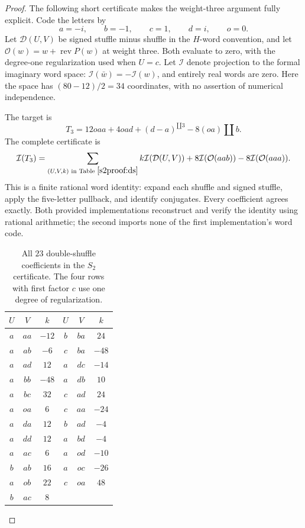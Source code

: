 \documentclass[11pt]{article}
\numberwithin{equation}{section}
\theoremstyle{plain}
\theoremstyle{definition}
\theoremstyle{remark}
\newcommand{\sh}{\mathbin{\amalg}}
\begin{document}
\begin{proof}
The following short certificate makes the weight-three argument fully
explicit.  Code the letters by
\[
 a=-i,\qquad b=-1,\qquad c=1,\qquad d=i,\qquad o=0.
\]
Let $\mathcal D(U,V)$ be signed stuffle minus shuffle in the $H$-word
convention, and let
$\mathcal O(w)=w+\operatorname{rev}P(w)$ at weight three.  Both evaluate
to zero, with the degree-one regularization used when $U=c$.
Let $\mathcal I$ denote projection to the formal imaginary word space:
$\mathcal I(\bar w)=-\mathcal I(w)$, and entirely real words are zero.
Here the space has $(80-12)/2=34$ coordinates, with no assertion of
numerical independence.

The target is
\[
 T_3=12oaa+4oad+(d-a)^{\sh3}-8(oa)\sh b.
\]
The complete certificate is
\begin{equation}\label{s2proof:certificate}
 \mathcal I(T_3)=
 \sum_{(U,V,k)\text{ in Table }\ref{s2proof:ds}}
 k\mathcal I(\mathcal D(U,V))
 +8\mathcal I(\mathcal O(aab))-8\mathcal I(\mathcal O(aaa)).
\end{equation}
This is a finite rational word identity: expand each shuffle and signed
stuffle, apply the five-letter pullback, and identify conjugates.  Every
coefficient agrees exactly.  Both provided implementations reconstruct
and verify the identity using rational arithmetic; the second imports
none of the first implementation's word code.

\begin{table}[htbp]
\centering
\begin{tabular}{ccc|ccc}
$U$&$V$&$k$&$U$&$V$&$k$\\ \hline
$a$&$aa$&$-12$&$b$&$ba$&$24$\\
$a$&$ab$&$-6$&$c$&$ba$&$-48$\\
$a$&$ad$&$12$&$a$&$dc$&$-14$\\
$a$&$bb$&$-48$&$a$&$db$&$10$\\
$a$&$bc$&$32$&$c$&$ad$&$24$\\
$a$&$oa$&$6$&$c$&$aa$&$-24$\\
$a$&$da$&$12$&$b$&$ad$&$-4$\\
$a$&$dd$&$12$&$a$&$bd$&$-4$\\
$a$&$ac$&$6$&$a$&$od$&$-10$\\
$b$&$ab$&$16$&$a$&$oc$&$-26$\\
$a$&$ob$&$22$&$c$&$oa$&$48$\\
$b$&$ac$&$8$&&&\\ \hline
\end{tabular}
\caption{All $23$ double-shuffle coefficients in the $S_2$ certificate.
The four rows with first factor $c$ use one degree of regularization.}
\label{s2proof:ds}
\end{table}


\end{proof}
\end{document}
